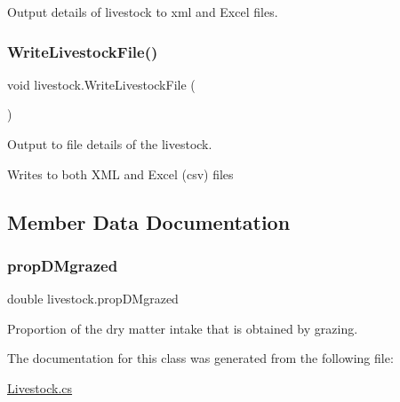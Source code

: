 Output details of livestock to xml and Excel files. 

\mbox{\label{classlivestock_a23c5edb2e2568bbcbe7357d56b6a5fb9}} 
\subsubsection{\texorpdfstring{WriteLivestockFile()}{WriteLivestockFile()}}
{\footnotesize\ttfamily void livestock.\+Write\+Livestock\+File (\begin{DoxyParamCaption}{ }\end{DoxyParamCaption})\hspace{0.3cm}{\ttfamily [inline]}}



Output to file details of the livestock. 

Writes to both X\+ML and Excel (csv) files 

\subsection{Member Data Documentation}
\mbox{\label{classlivestock_a4dbd96b6381bb6910c2b9af29955c991}} 
\subsubsection{\texorpdfstring{propDMgrazed}{propDMgrazed}}
{\footnotesize\ttfamily double livestock.\+prop\+D\+Mgrazed}



Proportion of the dry matter intake that is obtained by grazing. 



The documentation for this class was generated from the following file\+:\begin{DoxyCompactItemize}
\item 
\mbox{\hyperlink{_livestock_8cs}{Livestock.\+cs}}\end{DoxyCompactItemize}
